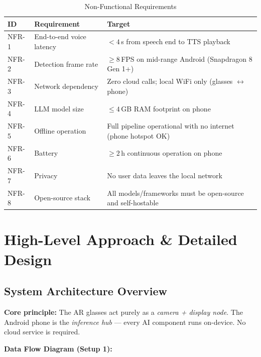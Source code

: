 \documentclass[11pt,a4paper]{article}
\begin{document}
\begin{table}[h!]
\centering
\renewcommand{\arraystretch}{1.3}
\begin{tabularx}{\textwidth}{L{2.5cm} L{5cm} L{6.5cm}}
\toprule
\textbf{ID} & \textbf{Requirement} & \textbf{Target} \\
\midrule
NFR-1 & End-to-end voice latency & $< 4$\,s from speech end to TTS playback \\
NFR-2 & Detection frame rate    & $\geq 8$\,FPS on mid-range Android (Snapdragon 8 Gen 1+) \\
NFR-3 & Network dependency      & Zero cloud calls; local WiFi only (glasses $\leftrightarrow$ phone) \\
NFR-4 & LLM model size          & $\leq 4$\,GB RAM footprint on phone \\
NFR-5 & Offline operation       & Full pipeline operational with no internet (phone hotspot OK) \\
NFR-6 & Battery                 & $\geq 2$\,h continuous operation on phone \\
NFR-7 & Privacy                 & No user data leaves the local network \\
NFR-8 & Open-source stack       & All models/frameworks must be open-source and self-hostable \\
\bottomrule
\end{tabularx}
\caption{Non-Functional Requirements}
\end{table}

\section{High-Level Approach \& Detailed Design}

\subsection{System Architecture Overview}

\begin{infobox}
\textbf{Core principle:}
The AR glasses act purely as a \emph{camera + display node}.
The Android phone is the \emph{inference hub} — every AI component runs
on-device. No cloud service is required.
\end{infobox}

\vspace{1em}
\textbf{Data Flow Diagram (Setup 1):}
\end{document}
